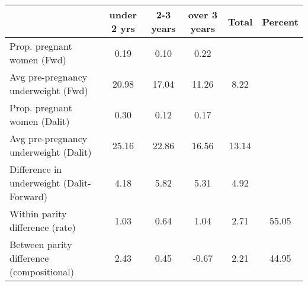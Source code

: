 \begin{tabular}{l*{5}{c}}
\toprule
            &\multicolumn{1}{c}{under 2 yrs}&\multicolumn{1}{c}{2-3 years}&\multicolumn{1}{c}{over 3 years}&\multicolumn{1}{c}{Total}&\multicolumn{1}{c}{Percent}\\
\midrule
\midrule
Prop. pregnant women (Fwd)&        0.19&        0.10&        0.22&            &            \\
Avg pre-pregnancy underweight (Fwd)&       20.98&       17.04&       11.26&        8.22&            \\
Prop. pregnant women (Dalit)&        0.30&        0.12&        0.17&            &            \\
Avg pre-pregnancy underweight (Dalit)&       25.16&       22.86&       16.56&       13.14&            \\
Difference in underweight (Dalit-Forward)&        4.18&        5.82&        5.31&        4.92&            \\
Within parity difference (rate)&        1.03&        0.64&        1.04&        2.71&       55.05\\
Between parity difference (compositional)&        2.43&        0.45&       -0.67&        2.21&       44.95\\
\bottomrule
\end{tabular}
